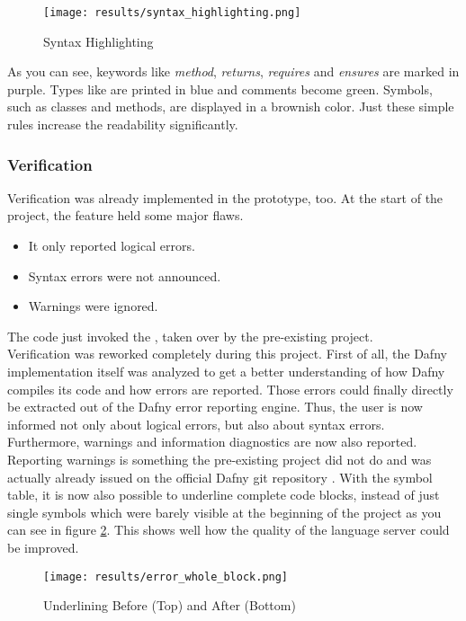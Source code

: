 \begin{figure}[H]
    \centering
    \texttt{[image: results/syntax\_highlighting.png]}
    \caption{Syntax Highlighting}
    \label{fig:result_syntax_highlight}
\end{figure}

As you can see, keywords like \textit{method}, \textit{returns}, \textit{requires} and \textit{ensures} are marked in purple.
Types like  are printed in blue and comments become green.
Symbols, such as classes and methods, are displayed in a brownish color.
Just these simple rules increase the readability significantly.

\subsubsection{Verification}
Verification was already implemented in the prototype, too.
At the start of the project, the feature held some major flaws.
\begin{itemize}
    \item It only reported logical errors.
    \item Syntax errors were not announced.
    \item Warnings were ignored.
\end{itemize}

The code just invoked the , taken over by the pre-existing project.\\

Verification was reworked completely during this project.
First of all, the Dafny implementation itself was analyzed to get a better understanding of how Dafny compiles its code and how errors are reported.
Those errors could finally directly be extracted out of the Dafny error reporting engine.
Thus, the user is now informed not only about logical errors, but also about syntax errors.
Furthermore, warnings and information diagnostics are now also reported.
Reporting warnings is something the pre-existing project did not do and was actually already issued on the official Dafny git repository \cite{dafny_noWarnings}.
With the symbol table, it is now also possible to underline complete code blocks,
instead of just single symbols which were barely visible at the beginning of the project as you can see in figure \ref{fig:error_whole_block}.
This shows well how the quality of the language server could be improved.

\begin{figure}[H]
    \centering
    \texttt{[image: results/error\_whole\_block.png]}
    \caption{Underlining Before (Top) and After (Bottom)}
    \label{fig:error_whole_block}
\end{figure}

